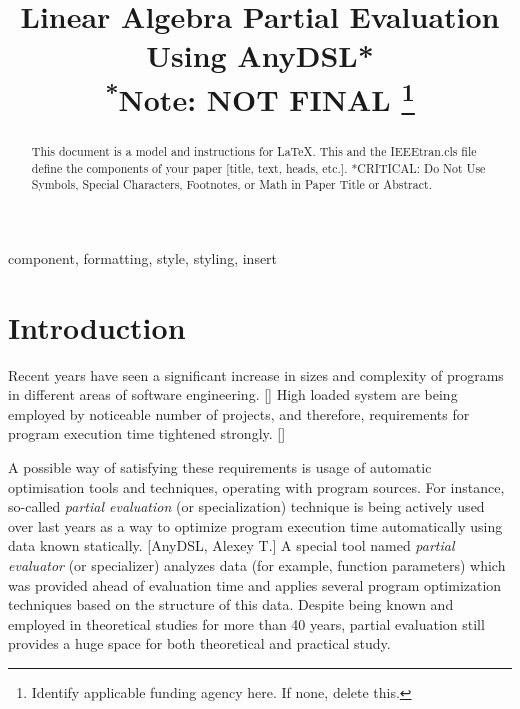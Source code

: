 \documentclass[conference]{IEEEtran}
\begin{document}
\linenumbers
\title{Linear Algebra Partial Evaluation Using AnyDSL*\\
{\footnotesize \textsuperscript{*}Note: NOT FINAL}
\thanks{Identify applicable funding agency here. If none, delete this.}
}

\author{
\and
{}
\and
{}
}
\maketitle

\begin{abstract}
This document is a model and instructions for \LaTeX.
This and the IEEEtran.cls file define the components of your paper [title, text, heads, etc.]. *CRITICAL: Do Not Use Symbols, Special Characters, Footnotes, 
or Math in Paper Title or Abstract.
\end{abstract}

\begin{IEEEkeywords}
component, formatting, style, styling, insert
\end{IEEEkeywords}

\section{Introduction}
Recent years have seen a significant increase in sizes and complexity of programs in different areas of software engineering. [] High loaded system are being employed by noticeable number of projects, and therefore, requirements for program execution time tightened strongly. [] 

A possible way of satisfying these requirements is usage of automatic optimisation tools and techniques, operating with program sources. For instance, so-called \textit{partial evaluation} (or specialization) technique is being actively used over last years as a way to optimize program execution time automatically using data known statically. [AnyDSL, Alexey T.] A special tool named \textit{partial evaluator} (or specializer) analyzes data (for example, function parameters) which was provided ahead of evaluation time and applies several program optimization techniques based on the structure of this data. Despite being known and employed in theoretical studies for more than 40 years, partial evaluation still provides a huge space for both theoretical and practical study. 
\end{document}
